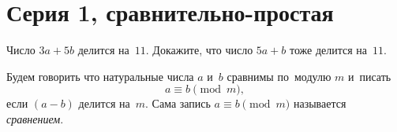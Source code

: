 

\section*{Серия 1, сравнительно-простая}


\begin{problems}

\item
Число $3 a + 5 b$ делится на~$11$.
Докажите, что число $5 a + b$ тоже делится на~$11$.

\end{problems}

Будем говорить что натуральные числа $a$ и~$b$ сравнимы по~модулю $m$ и~писать
\[
    a \equiv b \pmod{m}
,\]
если $(a - b)$ делится на~$m$.
Сама запись $a \equiv b \pmod{m}$ называется \emph{сравнением}.

